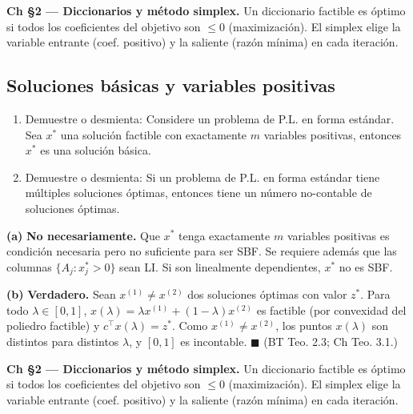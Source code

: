 \documentclass[12pt]{article}
\theoremstyle{plain}
\begin{document}
\begin{teofund}
\textbf{Ch §2 — Diccionarios y método simplex.} Un diccionario factible es óptimo si todos los coeficientes del objetivo son $\leq 0$ (maximización). El simplex elige la variable entrante (coef. positivo) y la saliente (razón mínima) en cada iteración.
\end{teofund}

\bigskip

\subsection{Soluciones básicas y variables positivas}

\begin{enumerate}[label=\alph*)]
      \item Demuestre o desmienta: Considere un problema de P.L. en forma estándar. Sea
            $x^*$ una solución factible con exactamente $m$ variables positivas, entonces
            $x^*$ es una solución básica.

      \item Demuestre o desmienta: Si un problema de P.L. en forma estándar tiene
            múltiples soluciones óptimas, entonces tiene un número no-contable de
            soluciones óptimas.
\end{enumerate}

\begin{solucion}

\noindent\textbf{(a)} \textbf{No necesariamente.} Que $x^*$ tenga exactamente $m$ variables positivas es condición necesaria pero no suficiente para ser SBF. Se requiere además que las columnas $\{A_j : x^*_j > 0\}$ sean LI. Si son linealmente dependientes, $x^*$ no es SBF.

\noindent\textbf{(b)} \textbf{Verdadero.} Sean $x^{(1)} \neq x^{(2)}$ dos soluciones óptimas con valor $z^*$. Para todo $\lambda \in [0,1]$, $x(\lambda) = \lambda x^{(1)} + (1-\lambda)x^{(2)}$ es factible (por convexidad del poliedro factible) y $c^\top x(\lambda) = z^*$. Como $x^{(1)} \neq x^{(2)}$, los puntos $x(\lambda)$ son distintos para distintos $\lambda$, y $[0,1]$ es incontable. $\blacksquare$ (BT Teo. 2.3; Ch Teo. 3.1.)

\end{solucion}

\begin{teofund}
\textbf{Ch §2 — Diccionarios y método simplex.} Un diccionario factible es óptimo si todos los coeficientes del objetivo son $\leq 0$ (maximización). El simplex elige la variable entrante (coef. positivo) y la saliente (razón mínima) en cada iteración.
\end{teofund}
\end{document}
